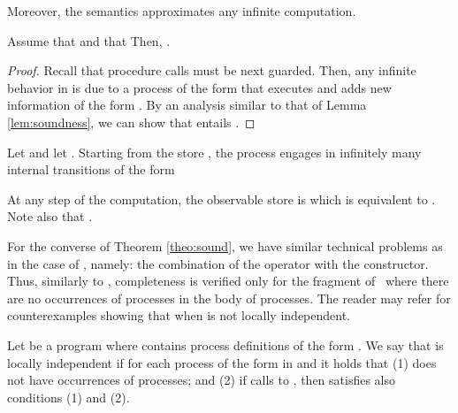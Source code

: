 \documentclass{tlp}
\begin{document}
Moreover, the semantics approximates any infinite computation.
\begin{corollary}
       Assume that  and  that  Then,  . 
\end{corollary}
\begin{proof}
 Recall that procedure calls must be next guarded. Then, any infinite behavior in  is due to a process of the form 
that executes  and adds new information of the form . By an analysis  similar to that of Lemma \ref{lem:soundness}, we can show that  entails . 
\end{proof}




\begin{example}
Let   and 
let . Starting from the store , the process    engages in infinitely many internal transitions of the form 

At any step of the computation, the observable store is  which is equivalent to . Note also that . 
\end{example}

 For the converse of Theorem \ref{theo:sound}, we have similar technical problems as in the case of \tccp,  namely: the combination of the  operator with the  constructor.  Thus, similarly to \tccp, completeness is verified only for the  fragment of \utcc\ where there are no occurrences of  processes in the body of  processes. The reader may refer \cite{BoerPP95,NPV02} for  counterexamples showing that   when  is not locally independent. 

 \begin{definition} \label{def:LI}
Let  be a program where  contains process definitions of the form .
We say that  is 
 locally independent if for each process of the form  in  and   it holds that 
(1)   does not have occurrences of  processes; and (2) if  calls to , then  satisfies also conditions (1) and (2).
\end{definition}
\end{document}
